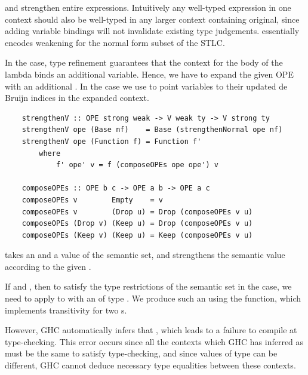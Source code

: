  and  strengthen entire expressions. Intuitively any well-typed expression in one context should also be well-typed in any larger context containing original, since adding variable bindings will not invalidate existing type judgements.  essentially encodes weakening for the normal form subset of the STLC. 

In the  case, type refinement guarantees that the context for the body of the lambda binds an additional variable. Hence, we have to expand the given OPE with an additional . In the  case we use  to point variables to their updated de Bruijn indices in the expanded context.

\begin{lstlisting}
    strengthenV :: OPE strong weak -> V weak ty -> V strong ty
    strengthenV ope (Base nf)    = Base (strengthenNormal ope nf)
    strengthenV ope (Function f) = Function f' 
        where
            f' ope' v = f (composeOPEs ope ope') v

    composeOPEs :: OPE b c -> OPE a b -> OPE a c
    composeOPEs v        Empty    = v
    composeOPEs v        (Drop u) = Drop (composeOPEs v u)
    composeOPEs (Drop v) (Keep u) = Drop (composeOPEs v u)
    composeOPEs (Keep v) (Keep u) = Keep (composeOPEs v u)
\end{lstlisting}

 takes an  and a value of the semantic set, and strengthens the semantic value according to the given .

If  and , then to satisfy the type restrictions of the semantic set in the  case, we need to apply  to  with an  of type . We produce such an  using the  function, which implements transitivity for two s.


However, GHC automatically infers that , which leads to a failure to compile at type-checking. This error occurs since all the contexts which GHC has inferred as  must be the same to satisfy type-checking, and since values of type  can be different, GHC cannot deduce necessary type equalities between these contexts. 

